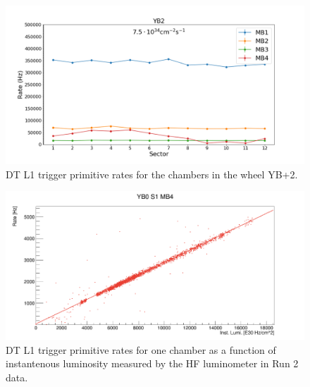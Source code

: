 \begin{figure}[hbtp]
\centering
\includegraphics[width=.7\linewidth]{tex/Part2/DT-RatesExtrapolated.png}
\caption{DT L1 trigger primitive rates for the chambers in the wheel YB+2.} 
\label{fig:DT_rates}
\end{figure}


\begin{figure}[hbtp]
\centering
\includegraphics[width=.7\linewidth]{tex/Part2/DT-Linearity.png}
\caption{DT L1 trigger primitive rates for one chamber  as a function of instantenous luminosity measured by the HF luminometer in Run 2 data.} 
\label{fig:DT_linearity}
\end{figure}
